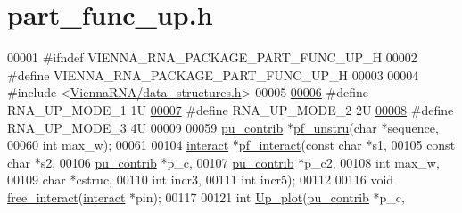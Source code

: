 \hypertarget{part__func__up_8h_source}{}\section{part\+\_\+func\+\_\+up.\+h}
\label{part__func__up_8h_source}

\begin{DoxyCode}
00001 \textcolor{preprocessor}{#ifndef VIENNA\_RNA\_PACKAGE\_PART\_FUNC\_UP\_H}
00002 \textcolor{preprocessor}{#define VIENNA\_RNA\_PACKAGE\_PART\_FUNC\_UP\_H}
00003 
00004 \textcolor{preprocessor}{#include <\mbox{\hyperlink{data__structures_8h}{ViennaRNA/data\_structures.h}}>}
00005 
\mbox{\hyperlink{part__func__up_8h_a8b383725f0e93e50f7e7a99bb2b1ef95}{00006}} \textcolor{preprocessor}{#define   RNA\_UP\_MODE\_1   1U}
\mbox{\hyperlink{part__func__up_8h_a90f0bbbea731d219b38368aa5f352a21}{00007}} \textcolor{preprocessor}{#define   RNA\_UP\_MODE\_2   2U}
\mbox{\hyperlink{part__func__up_8h_a90579142befc7aab9db8790ee6753fa9}{00008}} \textcolor{preprocessor}{#define   RNA\_UP\_MODE\_3   4U}
00009 
00059 \mbox{\hyperlink{group__data__structures_structpu__contrib}{pu\_contrib}} *\mbox{\hyperlink{group__up__cofold_ga5b4ee40e190d2f633cd01cf0d2fe93cf}{pf\_unstru}}(\textcolor{keywordtype}{char} *sequence,
00060                       \textcolor{keywordtype}{int} max\_w);
00061 
00104 \mbox{\hyperlink{group__data__structures_structinteract}{interact}} *\mbox{\hyperlink{group__up__cofold_ga1aa0aa02bc3a724f87360c03097afd00}{pf\_interact}}(\textcolor{keyword}{const} \textcolor{keywordtype}{char} *s1,
00105                       \textcolor{keyword}{const} \textcolor{keywordtype}{char} *s2,
00106                       \mbox{\hyperlink{group__data__structures_structpu__contrib}{pu\_contrib}} *p\_c,
00107                       \mbox{\hyperlink{group__data__structures_structpu__contrib}{pu\_contrib}} *p\_c2,
00108                       \textcolor{keywordtype}{int} max\_w,
00109                       \textcolor{keywordtype}{char} *cstruc,
00110                       \textcolor{keywordtype}{int} incr3,
00111                       \textcolor{keywordtype}{int} incr5);
00112 
00116 \textcolor{keywordtype}{void} \mbox{\hyperlink{group__up__cofold_gadde308fd5f696dc271b1532aa96fd12f}{free\_interact}}(\mbox{\hyperlink{group__data__structures_structinteract}{interact}} *pin);
00117 
00121 \textcolor{keywordtype}{int} \mbox{\hyperlink{group__up__cofold_ga73efd2918cbbb2cdf44422653f996852}{Up\_plot}}(\mbox{\hyperlink{group__data__structures_structpu__contrib}{pu\_contrib}} *p\_c,

\end{DoxyCode}
